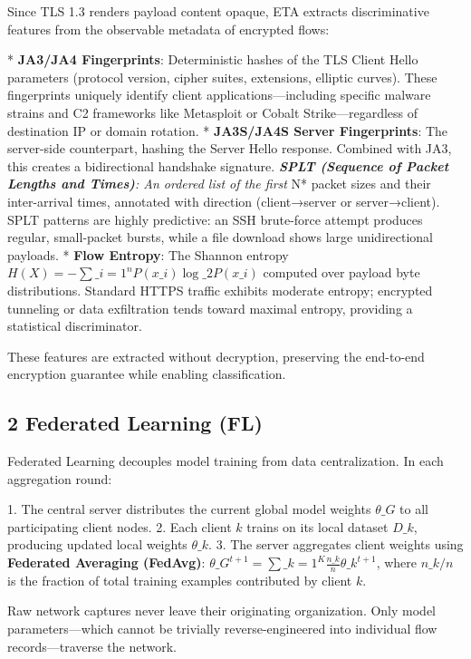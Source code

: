 \documentclass[conference]{IEEEtran}
\begin{document}
Since TLS 1.3 renders payload content opaque, ETA extracts discriminative features from the observable metadata of encrypted flows:

* \textbf{JA3/JA4 Fingerprints}: Deterministic hashes of the TLS Client Hello parameters (protocol version, cipher suites, extensions, elliptic curves). These fingerprints uniquely identify client applications—including specific malware strains and C2 frameworks like Metasploit or Cobalt Strike—regardless of destination IP or domain rotation.
* \textbf{JA3S/JA4S Server Fingerprints}: The server-side counterpart, hashing the Server Hello response. Combined with JA3, this creates a bidirectional handshake signature.
\textit{ \textbf{SPLT (Sequence of Packet Lengths and Times)}: An ordered list of the first }N* packet sizes and their inter-arrival times, annotated with direction (client→server or server→client). SPLT patterns are highly predictive: an SSH brute-force attempt produces regular, small-packet bursts, while a file download shows large unidirectional payloads.
* \textbf{Flow Entropy}: The Shannon entropy $H(X) = -\sum\_{i=1}^{n} P(x\_i) \log\_2 P(x\_i)$ computed over payload byte distributions. Standard HTTPS traffic exhibits moderate entropy; encrypted tunneling or data exfiltration tends toward maximal entropy, providing a statistical discriminator.

These features are extracted without decryption, preserving the end-to-end encryption guarantee while enabling classification.


\subsection{2 Federated Learning (FL)}

Federated Learning decouples model training from data centralization. In each aggregation round:

1. The central server distributes the current global model weights $\theta\_G$ to all participating client nodes.
2. Each client $k$ trains on its local dataset $D\_k$, producing updated local weights $\theta\_k$.
3. The server aggregates client weights using \textbf{Federated Averaging (FedAvg)}: $\theta\_G^{t+1} = \sum\_{k=1}^{K} \frac{n\_k}{n} \theta\_k^{t+1}$, where $n\_k / n$ is the fraction of total training examples contributed by client $k$.

Raw network captures never leave their originating organization. Only model parameters—which cannot be trivially reverse-engineered into individual flow records—traverse the network.
\end{document}
